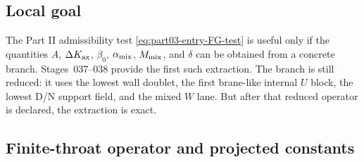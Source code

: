 \subsection{Local goal}
\label{subsec:part03-continuum-goal}

The Part II admissibility test \eqref{eq:part03-entry-FG-test} is useful only if the quantities \(A\), \(\Delta K_{\rm ax}\), \(\beta_0\), \(\alpha_{\rm mix}\), \(M_{\rm mix}\), and \(\delta\) can be obtained from a concrete branch.  Stages~037--038 provide the first such extraction.  The branch is still reduced: it uses the lowest wall doublet, the first brane-like internal \(U\) block, the lowest D/N support field, and the mixed \(W\) lane.  But after that reduced operator is declared, the extraction is exact.

\subsection{Finite-throat operator and projected constants}
\label{subsec:part03-continuum-operator}

